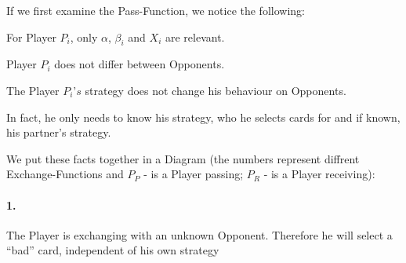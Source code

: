 If we first examine the Pass-Function, we notice the following:\\
\begin{axioms}[(F1)]
\item For Player $P_i$, only $\alpha$, $\beta_i$ and $X_i$ are relevant.
\item Player $P_i$ does not differ between Opponents. 
\item The Player $P_i’s$ strategy does not change his behaviour on Opponents. 
\item In fact, he only needs to know his strategy, who he selects cards for and if known, his partner’s strategy. 
\end{axioms}

We put these facts together in a Diagram (the numbers represent diffrent Exchange-Functions and $P_P$ - is a Player passing; $P_R$ - is a Player receiving):

\begin{table}[h]
\label{tab:my-table}
\end{table}
\paragraph{1.}
The Player is exchanging with an unknown Opponent. Therefore he will select a “bad” card, independent of his own strategy
